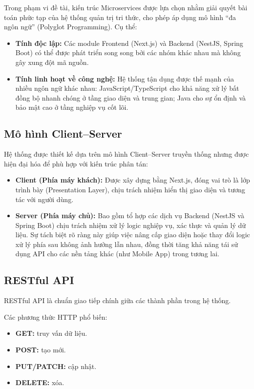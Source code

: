 \documentclass[12pt,a4paper]{report}
\begin{document}
Trong phạm vi đề tài, kiến trúc Microservices được lựa chọn nhằm giải quyết bài toán phức tạp của hệ thống quản trị tri thức, cho phép áp dụng mô hình ``đa ngôn ngữ'' (Polyglot Programming). Cụ thể:
\begin{itemize}
    \item \textbf{Tính độc lập:} Các module Frontend (Next.js) và Backend (NestJS, Spring Boot) có thể được phát triển song song bởi các nhóm khác nhau mà không gây xung đột mã nguồn.
    \item \textbf{Tính linh hoạt về công nghệ:} Hệ thống tận dụng được thế mạnh của nhiều ngôn ngữ khác nhau: JavaScript/TypeScript cho khả năng xử lý bất đồng bộ nhanh chóng ở tầng giao diện và trung gian; Java cho sự ổn định và bảo mật cao ở tầng nghiệp vụ cốt lõi.
\end{itemize}

\subsection{Mô hình Client--Server}
Hệ thống được thiết kế dựa trên mô hình Client--Server truyền thống nhưng được hiện đại hóa để phù hợp với kiến trúc phân tán:
\begin{itemize}
    \item \textbf{Client (Phía máy khách):} Được xây dựng bằng Next.js, đóng vai trò là lớp trình bày (Presentation Layer), chịu trách nhiệm hiển thị giao diện và tương tác với người dùng.
    \item \textbf{Server (Phía máy chủ):} Bao gồm tổ hợp các dịch vụ Backend (NestJS và Spring Boot) chịu trách nhiệm xử lý logic nghiệp vụ, xác thực và quản lý dữ liệu. Sự tách biệt rõ ràng này giúp việc nâng cấp giao diện hoặc thay đổi logic xử lý phía sau không ảnh hưởng lẫn nhau, đồng thời tăng khả năng tái sử dụng API cho các nền tảng khác (như Mobile App) trong tương lai.
\end{itemize}

\subsection{RESTful API}
RESTful API là chuẩn giao tiếp chính giữa các thành phần trong hệ thống.

Các phương thức HTTP phổ biến:
\begin{itemize}
    \item \textbf{GET:} truy vấn dữ liệu.
    \item \textbf{POST:} tạo mới.
    \item \textbf{PUT/PATCH:} cập nhật.
    \item \textbf{DELETE:} xóa.
\end{itemize}
\end{document}
